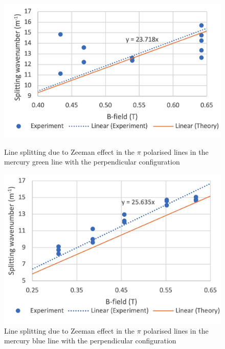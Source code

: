 \documentclass[11pt]{article}
\begin{document}
\begin{figure}[h!]
\centering
    \begin{minipage}[c]{0.47\textwidth}
        \centering
        \includegraphics[width=\linewidth]{Hg green pi perp small.png}
        \captionsetup{width=0.9\linewidth}
        \caption{Line splitting due to Zeeman effect in the $\pi$ polarised lines in the mercury green line with the perpendicular configuration}
        \label{fig: Hg green pi}
    \end{minipage}
    \begin{minipage}[c]{0.47\textwidth}
        \centering
        \includegraphics[width=\linewidth]{Hg blue pi perp small.png}
        \captionsetup{width=0.9\linewidth}
        \caption{Line splitting due to Zeeman effect in the $\pi$ polarised lines in the mercury blue line with the perpendicular configuration}
        \label{fig: Hg blue pi}
    \end{minipage}
\end{figure}
\end{document}
